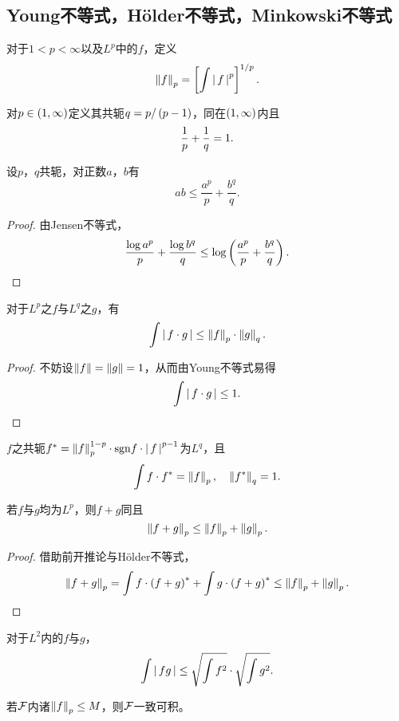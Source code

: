 \documentclass{ctexrep}
\begin{document}
  \subsection{Young不等式，H\"{o}lder不等式，Minkowski不等式}
  \begin{definition}
    对于$1<p<\infty$以及$L^p$中的$f$，定义
    \[ \left\| f \right\|_p = \left[\int \left|\, f \,\right|^p\right]^{1/p}.  \]
  \end{definition}
  \begin{definition}
    对$p\in\left(1,\infty\right)$定义其共轭$q=p/\left(p-1\right)$，同在$\left(1,\infty\right)$内且
    \[ \frac{1}{p}+\frac{1}{q}=1. \]
  \end{definition}
  \begin{theorem}[Young不等式]
    设$p$，$q$共轭，对正数$a$，$b$有
    \[ ab\le \frac{a^p}{p}+\frac{b^q}{q}. \]
  \end{theorem}
  \begin{proof}
    由Jensen不等式，
    \[ \frac{\log a^p}{p} + \frac{\log b^q}{q} \le \log\left(\frac{a^p}{p} + \frac{b^q}{q}\right). \qedhere \]
  \end{proof}
  \begin{theorem}[H\"{o}lder不等式]
    对于$L^p$之$f$与$L^q$之$g$，有
    \[ \int \left|\, f\cdot g \,\right| \le \left\| f \right\|_p \cdot\left\| g \right\|_q. \]
  \end{theorem}
  \begin{proof}
    不妨设$\left\| f \right\|=\left\| g \right\|=1$，从而由Young不等式易得
    \[ \int\left|\, f\cdot g \,\right| \le 1. \qedhere \]
  \end{proof}
  \begin{collary}
    $f$之共轭$f^* = \left\| f \right\|^{1-p}_p\cdot\mathrm{sgn}{f}\cdot\left|\, f \,\right|^{p-1}$为$L^q$，且
    \[ \int f\cdot f^* = \left\| f \right\|_p,\quad \left\| f^* \right\|_q=1. \]
  \end{collary}
  \begin{theorem}[Minkowski不等式]
    若$f$与$g$均为$L^p$，则$f+g$同且
    \[ \left\| f+g \right\|_p \le \left\| f \right\|_p + \left\| g \right\|_p. \]
  \end{theorem}
  \begin{proof}
    借助前开推论与H\"{o}lder不等式，
    \[ \left\| f+g \right\|_p = \int f\cdot\left(f+g\right)^* + \int g\cdot\left(f+g\right)^* \le \left\| f \right\|_p + \left\| g \right\|_p. \qedhere \]
  \end{proof}
  \begin{collary}
  对于$L^2$内的$f$与$g$，
    \[ \int\left|\, fg \,\right| \le \sqrt{\int f^2}\cdot\sqrt{\int g^2}. \]
  \end{collary}
  \begin{collary}
    若$\mathcal{F}$内诸$\left\| f \right\|_p\le M$，则$\mathcal{F}$一致可积。
  \end{collary}
\end{document}
